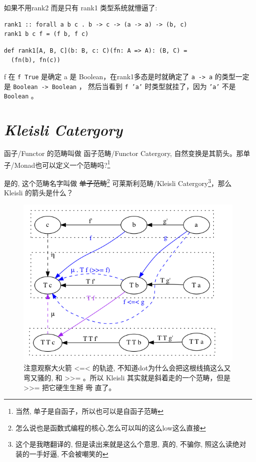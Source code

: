 \documentclass[letterspacing]{tufte-book}
\begin{document}
如果不用rank2 而是只有 rank1 类型系统就懵逼了:
\lstset{language=haskell,label= ,caption= ,captionpos=b,numbers=none}
\begin{lstlisting}
rank1 :: forall a b c . b -> c -> (a -> a) -> (b, c)
rank1 b c f = (f b, f c)
\end{lstlisting}

\lstset{language=scala,label= ,caption= ,captionpos=b,numbers=none}
\begin{lstlisting}
def rank1[A, B, C](b: B, c: C)(fn: A => A): (B, C) =
  (fn(b), fn(c))
\end{lstlisting}

f 在 \texttt{f True} 是确定 a 是 Boolean，在rank1多态是时就确定了 \texttt{a -> a} 的类型一定是 \texttt{Boolean -> Boolean} ，
然后当看到 \texttt{f 'a'} 时类型就挂了，因为 \texttt{'a'} 不是 \texttt{Boolean} 。

\chapter{\emph{Kleisli Catergory}}
\label{sec:org97818f4}

函子/Functor 的范畴叫做 函子范畴/Functor Catergory, 自然变换是其箭头。那单子/Monad也可以定义一个范畴吗?\footnote{当然, 单子是自函子，所以也可以是自函子范畴}

是的, 这个范畴名字叫做 \sout{单子范畴}\footnote{怎么说也是函数式编程的核心,怎么可以叫的这么low这么直接} 可莱斯利范畴/Kleisli Catergory\footnote{这个是我瞎翻译的, 但是读出来就是这么个意思, 真的, 不骗你, 照这么读绝对装的一手好逼, 不会被嘲笑的}，那么 Kleisli 的箭头是什么？

\begin{figure}[htbp]
\centering
\includegraphics[width=.9\linewidth]{images/kleisli.png}
\caption[\sout{弯}]{注意观察大火箭 <=< 的轨迹, 不知道dot为什么会把这根线搞这么又弯又骚的, 和 >>= 。所以 Kleisli 其实就是斜着走的一个范畴，但是 >>= 把它硬生生掰 \sout{弯} 直了。}
\end{figure}
\end{document}
